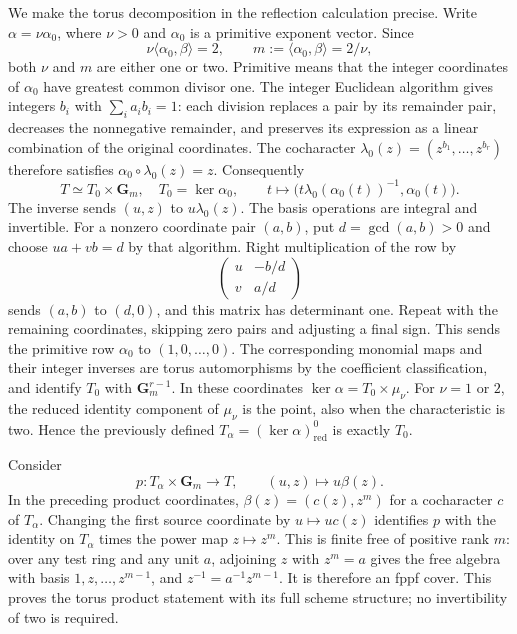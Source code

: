\documentclass[11pt,a4paper,openany]{report}
\begin{document}
We make the torus decomposition in the reflection calculation precise. Write \(\alpha=\nu\alpha_0\), where \(\nu>0\) and \(\alpha_0\) is a primitive exponent vector. Since \[
 \nu\langle\alpha_0,\beta\rangle=2,
 \qquad m:=\langle\alpha_0,\beta\rangle=2/\nu,
\] both \(\nu\) and \(m\) are either one or two. Primitive means that the integer coordinates of \(\alpha_0\) have greatest common divisor one. The integer Euclidean algorithm gives integers \(b_i\) with \(\sum_i a_i b_i=1\): each division replaces a pair by its remainder pair, decreases the nonnegative remainder, and preserves its expression as a linear combination of the original coordinates. The cocharacter \(\lambda_0(z)=(z^{b_1},\ldots,z^{b_r})\) therefore satisfies \(\alpha_0\circ\lambda_0(z)=z\). Consequently \[
 T\simeq T_0\times\mathbf G_m,\quad T_0=\ker\alpha_0,
 \qquad t\longmapsto
       \bigl(t\lambda_0(\alpha_0(t))^{-1},\alpha_0(t)\bigr).
\] The inverse sends \((u,z)\) to \(u\lambda_0(z)\). The basis operations are integral and invertible. For a nonzero coordinate pair \((a,b)\), put \(d=\gcd(a,b)>0\) and choose \(u a+v b=d\) by that algorithm. Right multiplication of the row by \[
 \begin{pmatrix}u&-b/d\\v&a/d\end{pmatrix}
\] sends \((a,b)\) to \((d,0)\), and this matrix has determinant one. Repeat with the remaining coordinates, skipping zero pairs and adjusting a final sign. This sends the primitive row \(\alpha_0\) to \((1,0,\ldots,0)\). The corresponding monomial maps and their integer inverses are torus automorphisms by the coefficient classification, and identify \(T_0\) with \(\mathbf G_m^{r-1}\). In these coordinates \(\ker\alpha=T_0\times\mu_\nu\). For \(\nu=1\) or \(2\), the reduced identity component of \(\mu_\nu\) is the point, also when the characteristic is two. Hence the previously defined \(T_\alpha=(\ker\alpha)^0_{\mathrm{red}}\) is exactly \(T_0\).

Consider \[
 p:T_\alpha\times\mathbf G_m\longrightarrow T,
                      \qquad (u,z)\longmapsto u\beta(z).
\] In the preceding product coordinates, \(\beta(z)=(c(z),z^m)\) for a cocharacter \(c\) of \(T_\alpha\). Changing the first source coordinate by \(u\mapsto u c(z)\) identifies \(p\) with the identity on \(T_\alpha\) times the power map \(z\mapsto z^m\). This is finite free of positive rank \(m\): over any test ring and any unit \(a\), adjoining \(z\) with \(z^m=a\) gives the free algebra with basis \(1,z,\ldots,z^{m-1}\), and \(z^{-1}=a^{-1}z^{m-1}\). It is therefore an fppf cover. This proves the torus product statement with its full scheme structure; no invertibility of two is required.
\end{document}
